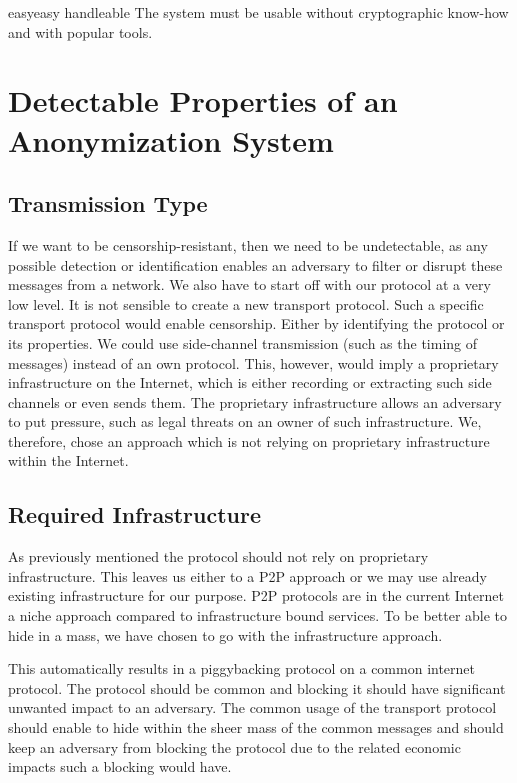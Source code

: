 \begin{requirement}{easy}{easy handleable}
	The system must be usable without cryptographic know-how and with popular tools.
\end{requirement}

\section{Detectable Properties of an Anonymization System}
\subsection{Transmission Type}
If we want to be censorship-resistant, then we need to be undetectable, as any possible detection or identification enables an adversary to filter or disrupt these messages from a network. We also have to start off with our protocol at a very low level. It is not sensible to create a new transport protocol. Such a specific transport protocol would enable censorship. Either by identifying the protocol or its properties. We could use side-channel transmission (such as the timing of messages) instead of an own protocol. This, however, would imply a proprietary infrastructure on the Internet, which is either recording or extracting such side channels or even sends them. The proprietary infrastructure allows an adversary to put pressure, such as legal threats on an owner of such infrastructure. We, therefore, chose an approach which is not relying on proprietary infrastructure within the Internet.

\subsection{Required Infrastructure}
As previously mentioned the protocol should not rely on proprietary infrastructure. This leaves us either to a P2P approach or we may use already existing infrastructure for our purpose. P2P protocols are in the current Internet a niche approach compared to infrastructure bound services. To be better able to hide in a mass, we have chosen to go with the infrastructure approach.

This automatically results in a piggybacking protocol on a common internet protocol. The protocol should be common and blocking it should have significant unwanted impact to an adversary. The common usage of the transport protocol should enable to hide within the sheer mass of the common messages and should keep an adversary from blocking the protocol due to the related economic impacts such a blocking would have.

